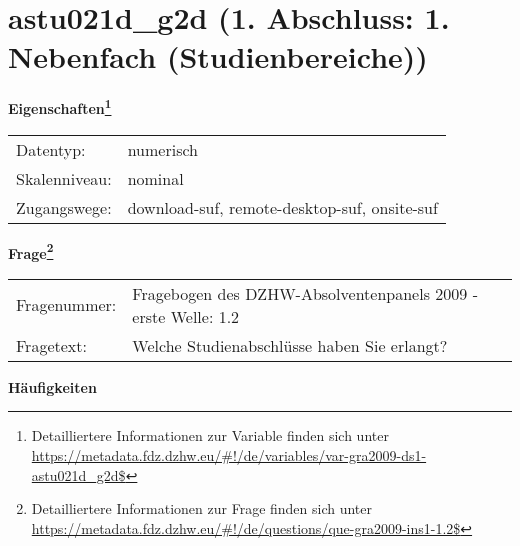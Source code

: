 
    \setcounter{footnote}{0}

    \vspace*{-1.8cm}
	\section{astu021d\_g2d (1. Abschluss: 1. Nebenfach (Studienbereiche))}
	\label{section:astu021d_g2d}



    \vspace*{0.5cm}
    \noindent\textbf{Eigenschaften\footnote{Detailliertere Informationen zur Variable finden sich unter
		\url{https://metadata.fdz.dzhw.eu/\#!/de/variables/var-gra2009-ds1-astu021d_g2d$}}}\\
	\begin{tabularx}{\hsize}{@{}lX}
	Datentyp: & numerisch \\
	Skalenniveau: & nominal \\
	Zugangswege: &
	  download-suf, 
	  remote-desktop-suf, 
	  onsite-suf
 \\
    \end{tabularx}



				\vspace*{0.5cm}
                \noindent\textbf{Frage\footnote{Detailliertere Informationen zur Frage finden sich unter
		              \url{https://metadata.fdz.dzhw.eu/\#!/de/questions/que-gra2009-ins1-1.2$}}}\\
				\begin{tabularx}{\hsize}{@{}lX}
					Fragenummer: &
					  Fragebogen des DZHW-Absolventenpanels 2009 - erste Welle:
					  1.2
 \\
					Fragetext: & Welche Studienabschlüsse haben Sie erlangt? \\
				\end{tabularx}





        		\vspace*{0.5cm}
                \noindent\textbf{Häufigkeiten}

